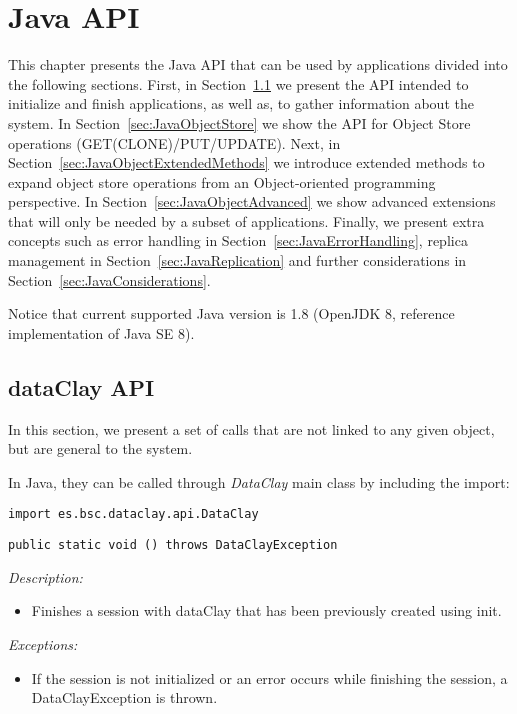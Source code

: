 
\chapter{Java API}
\label{sec:JavaAPI}

This chapter presents the Java API that can be used by applications divided into the following sections. First, in Section~\ref{sec:JavaGlobalAPI} we present the API intended to initialize and finish applications, as well as, to gather information about the system. In Section~\ref{sec:JavaObjectStore} we show the API for Object Store operations (GET(CLONE)/PUT/UPDATE). Next, in Section~\ref{sec:JavaObjectExtendedMethods} we introduce extended methods to expand object store operations from an Object-oriented programming perspective. In Section~\ref{sec:JavaObjectAdvanced} we show advanced extensions that will only be needed by a subset of applications. Finally, we present extra concepts such as error handling in Section~\ref{sec:JavaErrorHandling}, replica management in Section~\ref{sec:JavaReplication} and further considerations in Section~\ref{sec:JavaConsiderations}.

Notice that current supported Java version is 1.8 (OpenJDK 8, reference implementation of Java SE 8).

\section{dataClay API}
\label{sec:JavaGlobalAPI}

In this section, we present a set of calls that are not linked to any given object, but are general to the system.

In Java, they can be called through \textit{DataClay} main class by including the import:

\colorbox{basecolor!20}{\texttt{import es.bsc.dataclay.api.DataClay}}



\begin{dBox}
\texttt{public static void () throws DataClayException}
\LINE

{\it Description:}

\begin{itemize}
    \item Finishes a session with dataClay that has been previously created using init.
\end{itemize}

{\it Exceptions:}

\begin{itemize}
    \item If the session is not initialized or an error occurs while finishing the session, a DataClayException is thrown.
\end{itemize}
 
\end{dBox}


